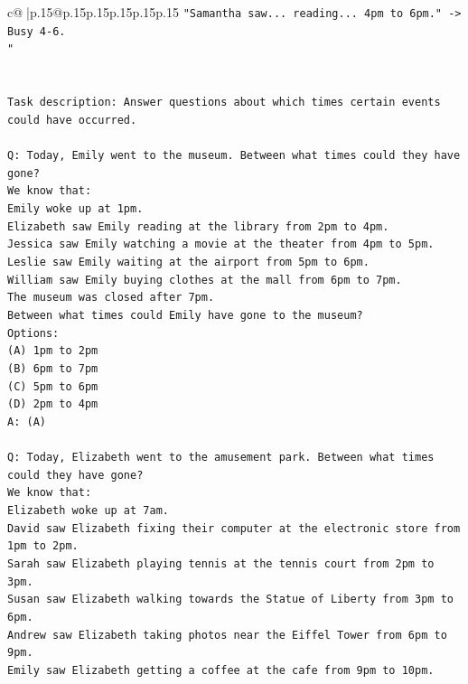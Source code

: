 \documentclass{article}
\begin{document}
{\begin{supertabular}{c@{$\;$}|p{.15\linewidth}@{}p{.15\linewidth}p{.15\linewidth}p{.15\linewidth}p{.15\linewidth}p{.15\linewidth}}
{{{\texttt{"Samantha saw... reading... 4pm to 6pm." {-}> Busy 4{-}6.} \\
\texttt{"} \\
\\ 
\\ 
\texttt{Task description: Answer questions about which times certain events could have occurred.} \\
\\ 
\texttt{Q: Today, Emily went to the museum. Between what times could they have gone?} \\
\texttt{We know that:} \\
\texttt{Emily woke up at 1pm.} \\
\texttt{Elizabeth saw Emily reading at the library from 2pm to 4pm.} \\
\texttt{Jessica saw Emily watching a movie at the theater from 4pm to 5pm.} \\
\texttt{Leslie saw Emily waiting at the airport from 5pm to 6pm.} \\
\texttt{William saw Emily buying clothes at the mall from 6pm to 7pm.} \\
\texttt{The museum was closed after 7pm.} \\
\texttt{Between what times could Emily have gone to the museum?} \\
\texttt{Options:} \\
\texttt{(A) 1pm to 2pm} \\
\texttt{(B) 6pm to 7pm} \\
\texttt{(C) 5pm to 6pm} \\
\texttt{(D) 2pm to 4pm} \\
\texttt{A: (A)} \\
\\ 
\texttt{Q: Today, Elizabeth went to the amusement park. Between what times could they have gone?} \\
\texttt{We know that:} \\
\texttt{Elizabeth woke up at 7am.} \\
\texttt{David saw Elizabeth fixing their computer at the electronic store from 1pm to 2pm.} \\
\texttt{Sarah saw Elizabeth playing tennis at the tennis court from 2pm to 3pm.} \\
\texttt{Susan saw Elizabeth walking towards the Statue of Liberty from 3pm to 6pm.} \\
\texttt{Andrew saw Elizabeth taking photos near the Eiffel Tower from 6pm to 9pm.} \\
\texttt{Emily saw Elizabeth getting a coffee at the cafe from 9pm to 10pm.} \\
}}}
\end{supertabular}}
\end{document}
